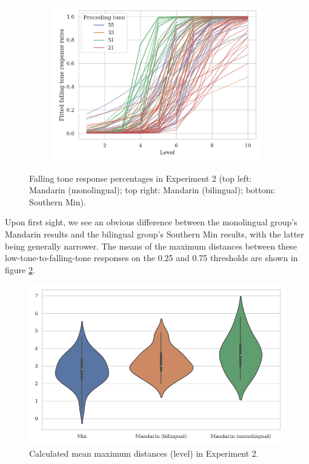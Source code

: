 \documentclass[12pt]{report}
\begin{document}
\begin{CJK}{UTF8}{bsmi}
\begin{figure}[hbt!]
\begin{subfigure}[b]{.45\textwidth}
\includegraphics[width=\textwidth]{Figures/E2/Min_E2_raw.png}
\end{subfigure}
\caption{Falling tone response percentages in Experiment 2 (top left: Mandarin (monolingual); top right: Mandarin (bilingual); bottom: Southern Min).}
\label{Figure:E2Raw}
\end{figure}

Upon first sight, we see an obvious difference between the monolingual group's Mandarin results and the bilingual group's Southern Min results, with the latter being generally narrower. The means of the maximum distances between these low-tone-to-falling-tone responses on the 0.25 and 0.75 thresholds are shown in figure \ref{Figure:DistBoxPlot}.

\begin{figure}[hbt!]
\centering
\includegraphics[width=\textwidth, trim={0 .5cm 0 0}]{Figures/E2/Result.png}
\caption{Calculated mean maximum distances (level) in Experiment 2.}
\label{Figure:DistBoxPlot}
\end{figure}


\end{CJK}
\end{document}
